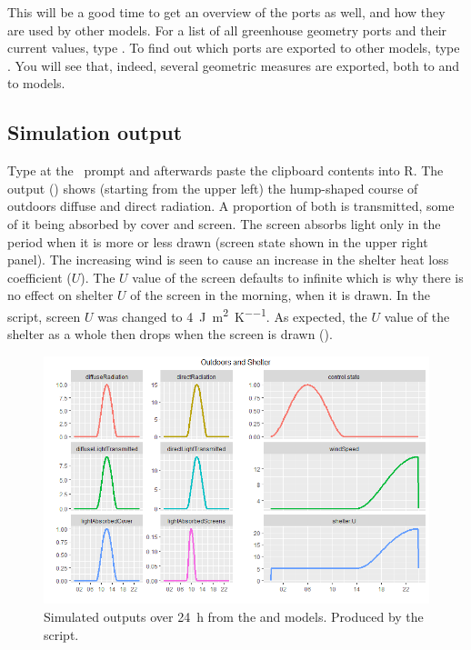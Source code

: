 This will be a good time to get an overview of the  ports as well, and how they are used by other models. For a list of all greenhouse  geometry ports and their current values, type . To find out which ports are exported to other models, type . You will see that, indeed, several geometric measures are exported, both to  and to  models.

\subsection {Simulation output}
Type  at the \US\ prompt and afterwards paste the clipboard contents into R. The output () shows (starting from the upper left) the hump-shaped course of outdoors diffuse and direct radiation. A proportion of both is transmitted, some of it being absorbed by cover and screen. The screen absorbs light only in the period when it is more or less drawn (screen state shown in the upper right panel). The increasing wind is seen to cause an increase in the shelter heat loss coefficient ($U$). The $U$ value of the screen defaults to infinite which is why there is no effect on shelter $U$ of the screen in the morning, when it is drawn. In the  script, screen $U$ was changed to \SI{4}{\joule\per\meter\squared\per\kelvin}. As expected, the $U$ value of the shelter as a whole then drops when the screen is drawn ().

\begin{figure} [hb]
\centering
\includegraphics[width=1.0\textwidth]{graphics/vg/construction-outdoors-shelter}
\caption{Simulated outputs over \SI{24}{\hour} from the  and  models. Produced by the  script.}
\label{fig:vg-construction-outdoors-shelter}
\end{figure}

